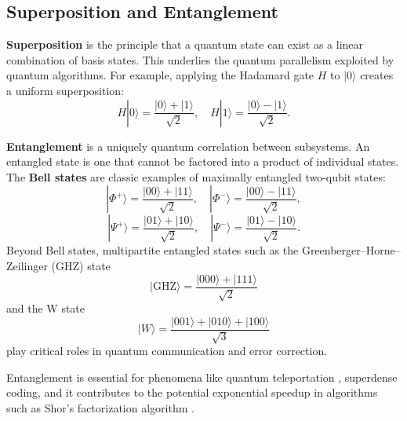 
\subsection{Superposition and Entanglement}
\label{subsec:superposition}

\textbf{Superposition} is the principle that a quantum state can exist as a linear combination of basis states. This underlies the quantum parallelism exploited by quantum algorithms. For example, applying the Hadamard gate \(H\) to \(|0\rangle\) creates a uniform superposition:
\[
H|0\rangle = \frac{|0\rangle + |1\rangle}{\sqrt{2}}, \quad H|1\rangle = \frac{|0\rangle - |1\rangle}{\sqrt{2}}.
\]

\textbf{Entanglement} is a uniquely quantum correlation between subsystems. An entangled state is one that cannot be factored into a product of individual states. The \textbf{Bell states} are classic examples of maximally entangled two-qubit states:
\[
|\Phi^+\rangle = \frac{|00\rangle + |11\rangle}{\sqrt{2}}, \quad
|\Phi^-\rangle = \frac{|00\rangle - |11\rangle}{\sqrt{2}},
\]
\[
|\Psi^+\rangle = \frac{|01\rangle + |10\rangle}{\sqrt{2}}, \quad
|\Psi^-\rangle = \frac{|01\rangle - |10\rangle}{\sqrt{2}}.
\]
Beyond Bell states, multipartite entangled states such as the Greenberger–Horne–Zeilinger (GHZ) state
\[
|\text{GHZ}\rangle = \frac{|000\rangle + |111\rangle}{\sqrt{2}}
\]
and the W state
\[
|W\rangle = \frac{|001\rangle + |010\rangle + |100\rangle}{\sqrt{3}}
\]
play critical roles in quantum communication and error correction.

Entanglement is essential for phenomena like quantum teleportation \cite{bennett1993teleporting}, superdense coding, and it contributes to the potential exponential speedup in algorithms such as Shor's factorization algorithm \cite{shor1999polynomial}.
